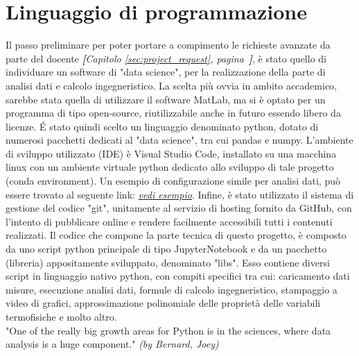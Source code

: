 \documentclass[a4paper,10pt]{article}                                                                                       %
\begin{document}
\section{Linguaggio di programmazione}                                                                                      %
\label{sec:progr_lang}                                                                                                      %
  Il passo preliminare per poter portare a compimento le richieste avanzate da parte del docente
  \textit{\textbf{[}Capitolo \ref{sec:project_request}, pagina~\pageref{sec:project_request}\textbf{]}}, è stato quello di
  individuare un software di "data science", per la realizzazione della parte di analisi dati e calcolo ingegneristico. La
  scelta più ovvia in ambito accademico, sarebbe stata quella di utilizzare il software MatLab, ma si è optato per un
  programma di tipo open-source, riutilizzabile anche in futuro essendo libero da licenze. É stato quindi scelto un
  linguaggio denominato python, dotato di numerosi pacchetti dedicati al "data science", tra cui pandas e numpy.
  L'ambiente di sviluppo utilizzato (IDE) è Visual Studio Code, installato su una macchina linux con un ambiente virtuale
  python dedicato allo sviluppo di tale progetto (conda environment). Un esempio di configurazione simile per analisi
  dati, può essere trovato al seguente link:
  \textit{\href{https://code.visualstudio.com/docs/datascience/data-science-tutorial}{vedi esempio}}. Infine, è stato
  utilizzato il sistema di gestione del codice "git", unitamente al servizio di hosting fornito da GitHub, con l'intento
  di pubblicare online e rendere facilmente accessibili tutti i contenuti realizzati. Il codice che compone la parte
  tecnica di questo progetto, è composto da uno script python principale di tipo JupyterNotebook e da un pacchetto
  (libreria) appositamente sviluppato, denominato "libs". Esso contiene diversi script in linguaggio nativo python, con
  compiti specifici tra cui: caricamento dati misure, esecuzione analisi dati, formule di calcolo ingegneristico,
  stampaggio a video di grafici, approssimazione polinomiale delle proprietà delle variabili termofisiche e molto
  altro.\vspace{2mm}\\
  "One of the really big growth areas for Python is in the sciences, where data analysis is a huge component."
  \textit{(by Bernard, Joey)}
  \cite{Bernard2016}
\end{document}
